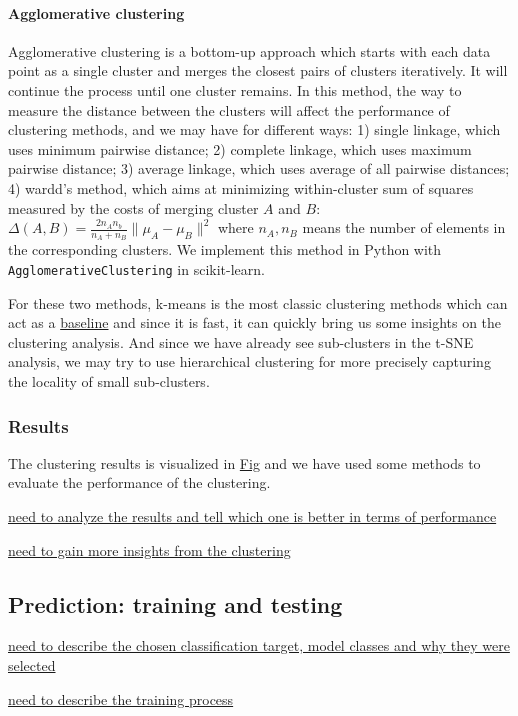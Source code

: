 \documentclass{article}
\begin{document}
\paragraph{Agglomerative clustering} Agglomerative clustering is a bottom-up approach which starts with each data point as a single cluster and merges the closest pairs of clusters iteratively. It will continue the process until one cluster remains. In this method, the way to measure the distance between the clusters will affect the performance of clustering methods, and we may have for different ways: 1) single linkage, which uses minimum pairwise distance; 2) complete linkage,
which uses maximum pairwise distance; 3) average linkage, which uses average of all pairwise distances; 4) wardd's method, which aims at minimizing within-cluster sum of squares measured by the costs of merging cluster $A$ and $B$: $\Delta(A, B)=\frac{2n_An_b}{n_A+n_B}\|\mu_A-\mu_B\|^2$ where $n_A, n_B$ means the number of elements in the corresponding clusters. We implement this method in Python with \texttt{AgglomerativeClustering} in scikit-learn.

For these two methods, k-means is the most classic clustering methods which can act as a \underline{baseline} and since it is fast, it can quickly bring us some insights on the clustering analysis. And since we have already see sub-clusters in the t-SNE analysis, we may try to use hierarchical clustering for more precisely capturing the locality of small sub-clusters.

\subsubsection*{Results}

The clustering results is visualized in \underline{Fig} and we have used some methods to evaluate the performance of the clustering.

\underline{need to analyze the results and tell which one is better in terms of performance}

\underline{need to gain more insights from the clustering}


\subsection{Prediction: training and testing}

\underline{need to describe the chosen classification target, model classes and why they were selected}

\underline{need to describe the training process}
\end{document}
